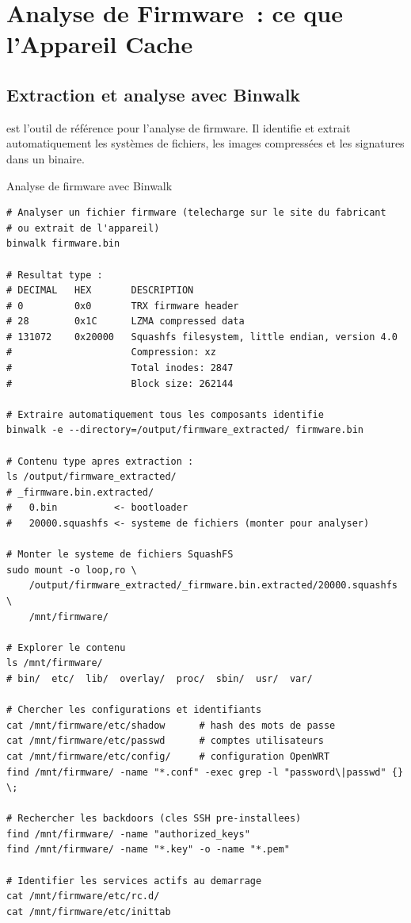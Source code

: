 \section{Analyse de Firmware~: ce que l'Appareil Cache}
\label{sec:analyse-firmware}

\subsection{Extraction et analyse avec Binwalk}

 est l'outil de référence pour l'analyse
de firmware. Il identifie et extrait automatiquement les systèmes de
fichiers, les images compressées et les signatures dans un binaire.

\begin{boxoutils}{Analyse de firmware avec Binwalk}
\begin{lstlisting}[language=bash_forensique]
# Analyser un fichier firmware (telecharge sur le site du fabricant
# ou extrait de l'appareil)
binwalk firmware.bin

# Resultat type :
# DECIMAL   HEX       DESCRIPTION
# 0         0x0       TRX firmware header
# 28        0x1C      LZMA compressed data
# 131072    0x20000   Squashfs filesystem, little endian, version 4.0
#                     Compression: xz
#                     Total inodes: 2847
#                     Block size: 262144

# Extraire automatiquement tous les composants identifie
binwalk -e --directory=/output/firmware_extracted/ firmware.bin

# Contenu type apres extraction :
ls /output/firmware_extracted/
# _firmware.bin.extracted/
#   0.bin          <- bootloader
#   20000.squashfs <- systeme de fichiers (monter pour analyser)

# Monter le systeme de fichiers SquashFS
sudo mount -o loop,ro \
    /output/firmware_extracted/_firmware.bin.extracted/20000.squashfs \
    /mnt/firmware/

# Explorer le contenu
ls /mnt/firmware/
# bin/  etc/  lib/  overlay/  proc/  sbin/  usr/  var/

# Chercher les configurations et identifiants
cat /mnt/firmware/etc/shadow      # hash des mots de passe
cat /mnt/firmware/etc/passwd      # comptes utilisateurs
cat /mnt/firmware/etc/config/     # configuration OpenWRT
find /mnt/firmware/ -name "*.conf" -exec grep -l "password\|passwd" {} \;

# Rechercher les backdoors (cles SSH pre-installees)
find /mnt/firmware/ -name "authorized_keys"
find /mnt/firmware/ -name "*.key" -o -name "*.pem"

# Identifier les services actifs au demarrage
cat /mnt/firmware/etc/rc.d/
cat /mnt/firmware/etc/inittab
\end{lstlisting}
\end{boxoutils}

